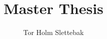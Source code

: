 



\author{Tor Holm Slettebak}
\title{Master Thesis}


\maketitle
\thispagestyle{empty}
\clearpage



\tableofcontents
\listoffigures
\listoftables
\clearpage
{}
\setcounter{page}{1}












% 
% 
% 

\printbibliography
\begin{appendices}
  \appendixpage

\end{appendices}


